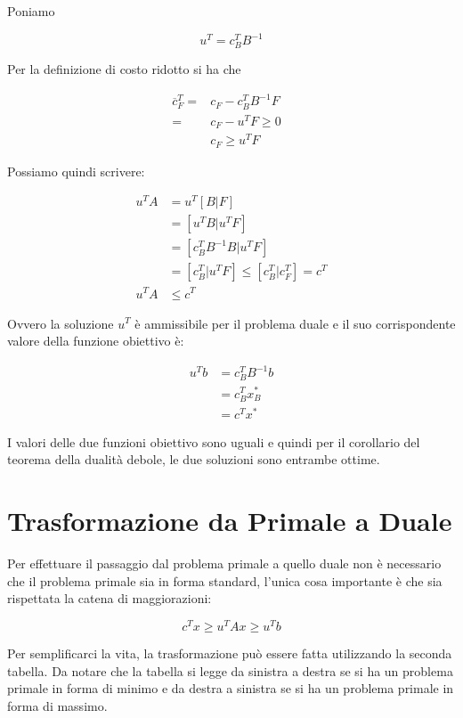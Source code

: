 Poniamo

$$
u^T = c_{B}^TB^{-1}
$$

Per la definizione di costo ridotto si ha che

\begin{align*}
\overline{c}_{F}^T = &c_F - c_{B}^TB^{-1}F & \\
				   = &c_F - u^T F \geq 0 \\
					  &c_F \geq u^T F	                
\end{align*}

Possiamo quindi scrivere:

\begin{align*}
	u^T A &= u^T[B|F] \\
	      &= [u^TB |u^T F] \\
	      &= [c_{B}^TB^{-1} B |u^T F] \\
	      &= [c_{B}^T |u^T F] \leq [c_{B}^T | c_{F}^T] = c^T \\
    u^T A &\leq c^T
\end{align*}

Ovvero la soluzione $u^T$ è ammissibile per il problema duale e il suo corrispondente valore della funzione obiettivo è:

\begin{align*}
	u^T b &= c_{B}^T B^{-1} b \\
	      &= c_{B}^T x_{B}^* \\
	      &= c^Tx^*
\end{align*}

I valori delle due funzioni obiettivo sono uguali e quindi per il corollario del teorema della dualità debole, le due soluzioni sono entrambe ottime.

\section{Trasformazione da Primale a Duale}

Per effettuare il passaggio dal problema primale a quello duale non è necessario che il problema primale sia in forma standard, l'unica cosa importante è che sia rispettata la catena di maggiorazioni:

$$
c^T x \geq u^T Ax \geq u^Tb
$$

\noindent Per semplificarci la vita, la trasformazione può essere fatta utilizzando la seconda tabella. Da notare che la tabella si legge da sinistra a destra se si ha un problema primale in forma di minimo e da destra a sinistra se si ha un problema primale in forma di massimo.

